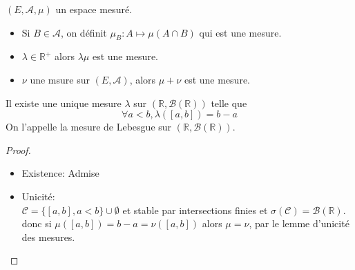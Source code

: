 \begin{prop}
	$(E, \mathscr{A}, \mu)$ un espace mesuré.
	\begin{itemize}
		\item Si $B \in \mathscr{A}$, on définit $\mu_B : A \mapsto \mu(A \cap B)$ qui est une mesure.
		\item $\lambda \in \mathbb{R}^+$ alors $\lambda \mu$ est une mesure.
		\item $\nu$ une msure sur $(E, \mathscr{A})$, alors $\mu + \nu$ est une mesure.
	\end{itemize}
\end{prop}


\begin{theorem}
	Il existe une unique mesure $\lambda$ sur $(\mathbb{R}, \mathscr{B}(\mathbb{R}))$ telle que
	$$ \forall a < b, \lambda([a,b]) = b-a $$
	On l'appelle la mesure de Lebesgue sur $(\mathbb{R}, \mathscr{B}(\mathbb{R}))$.
\end{theorem}

\begin{proof}
	\begin{itemize}
		\item Existence: Admise
		\item Unicité: \\
		      $\mathscr{C} = \{ [a,b], a < b \} \cup \emptyset$ et stable par intersections finies et $\sigma (\mathscr{C}) = \mathscr{B}(\mathbb{R})$.
		      donc si $\mu([a,b]) = b-a = \nu([a,b])$ alors $\mu = \nu$, par le lemme d'unicité des mesures.
	\end{itemize}
\end{proof}
